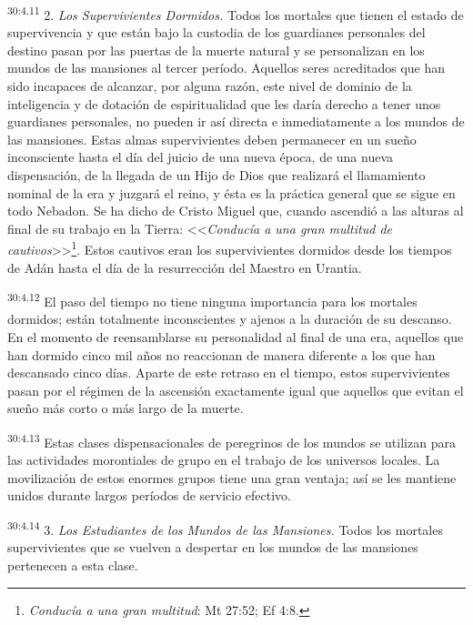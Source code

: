 \par
\textsuperscript{30:4.11} 2. \textit{Los Supervivientes Dormidos.} Todos los mortales que tienen el estado de supervivencia y que están bajo la custodia de los guardianes personales del destino pasan por las puertas de la muerte natural y se personalizan en los mundos de las mansiones al tercer período. Aquellos seres acreditados que han sido incapaces de alcanzar, por alguna razón, este nivel de dominio de la inteligencia y de dotación de espiritualidad que les daría derecho a tener unos guardianes personales, no pueden ir así directa e inmediatamente a los mundos de las mansiones. Estas almas supervivientes deben permanecer en un sueño inconsciente hasta el día del juicio de una nueva época, de una nueva dispensación, de la llegada de un Hijo de Dios que realizará el llamamiento nominal de la era y juzgará el reino, y ésta es la práctica general que se sigue en todo Nebadon. Se ha dicho de Cristo Miguel que, cuando ascendió a las alturas al final de su trabajo en la Tierra: <<\textit{Conducía a una gran multitud de cautivos}>>\footnote{\textit{Conducía a una gran multitud}: Mt 27:52; Ef 4:8.}. Estos cautivos eran los supervivientes dormidos desde los tiempos de Adán hasta el día de la resurrección del Maestro en Urantia.

\par
\textsuperscript{30:4.12} El paso del tiempo no tiene ninguna importancia para los mortales dormidos; están totalmente inconscientes y ajenos a la duración de su descanso. En el momento de reensamblarse su personalidad al final de una era, aquellos que han dormido cinco mil años no reaccionan de manera diferente a los que han descansado cinco días. Aparte de este retraso en el tiempo, estos supervivientes pasan por el régimen de la ascensión exactamente igual que aquellos que evitan el sueño más corto o más largo de la muerte.

\par
\textsuperscript{30:4.13} Estas clases dispensacionales de peregrinos de los mundos se utilizan para las actividades morontiales de grupo en el trabajo de los universos locales. La movilización de estos enormes grupos tiene una gran ventaja; así se les mantiene unidos durante largos períodos de servicio efectivo.

\par
\textsuperscript{30:4.14} 3. \textit{Los Estudiantes de los Mundos de las Mansiones.} Todos los mortales supervivientes que se vuelven a despertar en los mundos de las mansiones pertenecen a esta clase.


